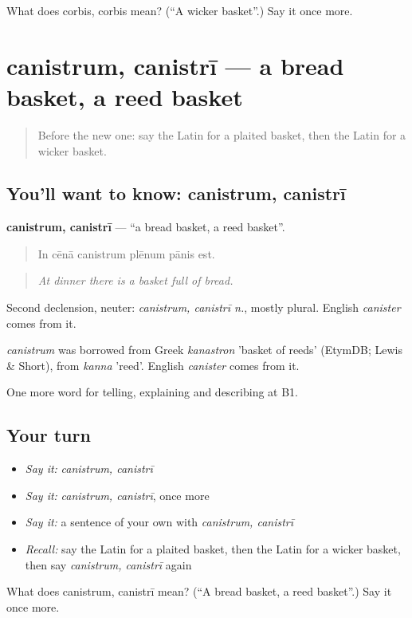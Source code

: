 \begin{tcolorbox}[breakable,colback=teal!4,colframe=teal!35!black,title={Before you move on}]
What does corbis, corbis mean? (\textquotedblleft{}A wicker basket\textquotedblright{}.) Say it once more.
\end{tcolorbox}
\section[canistrum, canistrī]{canistrum, canistrī — a bread basket, a reed basket}

\label{lesson:LA-C463-canistrum}



\begin{quote}
Before the new one: say the Latin for a plaited basket, then the Latin for a wicker basket.
\end{quote}

\subsection*{You'll want to know: canistrum, canistrī}
\textbf{canistrum, canistrī} — \textquotedblleft{}a bread basket, a reed basket\textquotedblright{}.

\begin{quote}
In cēnā canistrum plēnum pānis est.
\end{quote}

\begin{quote}
\emph{At dinner there is a basket full of bread.}
\end{quote}

Second declension, neuter: \emph{canistrum, canistrī n.}, mostly plural. English \emph{canister} comes from it.

\begin{cousinweb}
\emph{canistrum} was borrowed from Greek \emph{kanastron} 'basket of reeds' (EtymDB; Lewis \& Short), from \emph{kanna} 'reed'. English \emph{canister} comes from it.
\end{cousinweb}

\begin{grammarlens}[title={What you've built}]
One more word for telling, explaining and describing at B1.
\end{grammarlens}

\subsection*{Your turn}
\begin{itemize}
\raggedright
  \item \emph{Say it:} \emph{canistrum, canistrī}
  \item \emph{Say it:} \emph{canistrum, canistrī}, once more
  \item \emph{Say it:} a sentence of your own with \emph{canistrum, canistrī}
  \item \emph{Recall:} say the Latin for a plaited basket, then the Latin for a wicker basket, then say \emph{canistrum, canistrī} again
\end{itemize}

\begin{tcolorbox}[breakable,colback=teal!4,colframe=teal!35!black,title={Before you move on}]
What does canistrum, canistrī mean? (\textquotedblleft{}A bread basket, a reed basket\textquotedblright{}.) Say it once more.
\end{tcolorbox}
